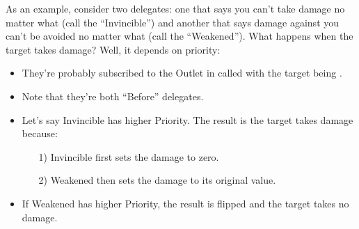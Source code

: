 \begin{enumerate}
{\begin{itemize}
{\begin{tcolorbox}[colback=gray!20!white,colframe=blue!75!black,title=Priorities]
			As an example, consider two delegates: one that says you can't take damage no matter what (call the  ``Invincible'') and another that says damage against you can't be avoided no matter what (call the  ``Weakened''). What happens when the target takes damage? Well, it depends on priority:
			\begin{itemize}
				\item{They're probably subscribed to the Outlet in  called  with the target  being .}
				\item{Note that they're both ``Before'' delegates.}
				\item{Let's say Invincible has higher Priority. The result is the target takes damage because:
					\begin{enumerate}
						\item[1)]{Invincible first sets the damage to zero.}
						\item[2)]{Weakened then sets the damage to its original value.}
					\end{enumerate}
				}
				\item{If Weakened has higher Priority, the result is flipped and the target takes no damage.}
			\end{itemize}
	 

\end{tcolorbox}}
\end{itemize}}
\end{enumerate}
